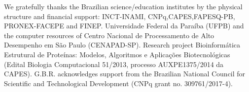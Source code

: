\documentclass[a4paper,11pt]{refart}
\begin{document}
We gratefully thanks the Brazilian science/education institutes by the physical structure and financial support: INCT-INAMI, CNPq,CAPES,FAPESQ-PB, PRONEX-FACEPE and FINEP. Universidade Federal da Paraíba (UFPB) and the computer resources of Centro Nacional de Processamento de Alto Desempenho em São Paulo (CENAPAD-SP). 		
Research project Bioinformática Estrutural de Proteínas: Modelos, Algoritmos e Aplicações Biotecnológicas (Edital Biologia Computacional 51/2013, processo AUXPE1375/2014 da CAPES). G.B.R. acknowledges support from the Brazilian National Council for Scientific and Technological Development (CNPq grant no. 309761/2017-4).



\newpage

\end{document}
